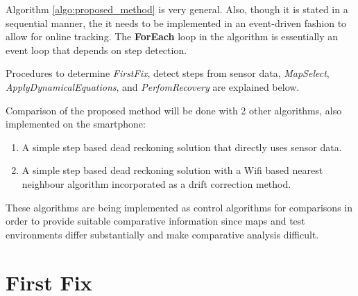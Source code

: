 Algorithm \ref{algo:proposed_method} is very general. Also, though it is 
stated in a sequential manner, the it needs to 
be implemented in an event-driven fashion to allow for online tracking. 
The \textbf{ForEach} loop in the algorithm is essentially an event loop 
that depends on step detection.

Procedures to determine \emph{FirstFix}, detect steps from sensor data, 
\emph{MapSelect}, \emph{ApplyDynamicalEquations}, and \emph{PerfomRecovery} are explained
below.


Comparison of the proposed method will be done with 2 other algorithms, also
implemented on the smartphone: 

\begin{enumerate}
\item A simple step based dead reckoning solution that directly uses sensor data.
\item A simple step based dead reckoning solution with a Wifi based nearest neighbour algorithm incorporated as a 
    drift correction method.    
\end{enumerate}

These algorithms are being implemented as control algorithms for comparisons
in order to provide suitable comparative information since maps and test 
environments differ substantially and make comparative analysis difficult.

\section{First Fix\label{sec:first_fix}}


